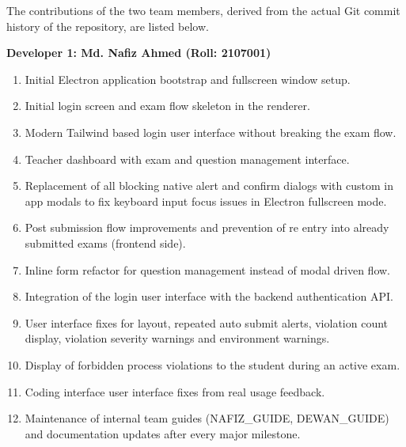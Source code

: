 \documentclass[12pt, a4paper]{report}
\begin{document}
\begin{justify}
  {\fontsize{12}{18}\selectfont
    The contributions of the two team members, derived from the actual Git commit history of the repository, are listed below.

    \textbf{Developer 1: Md. Nafiz Ahmed (Roll: 2107001)}
    \begin{enumerate}
        \item Initial Electron application bootstrap and fullscreen window setup.
        \item Initial login screen and exam flow skeleton in the renderer.
        \item Modern Tailwind based login user interface without breaking the exam flow.
        \item Teacher dashboard with exam and question management interface.
        \item Replacement of all blocking native alert and confirm dialogs with custom in app modals to fix keyboard input focus issues in Electron fullscreen mode.
        \item Post submission flow improvements and prevention of re entry into already submitted exams (frontend side).
        \item Inline form refactor for question management instead of modal driven flow.
        \item Integration of the login user interface with the backend authentication API.
        \item User interface fixes for layout, repeated auto submit alerts, violation count display, violation severity warnings and environment warnings.
        \item Display of forbidden process violations to the student during an active exam.
        \item Coding interface user interface fixes from real usage feedback.
        \item Maintenance of internal team guides (NAFIZ\_GUIDE, DEWAN\_GUIDE) and documentation updates after every major milestone.
    \end{enumerate}

}
\end{justify}
\end{document}
